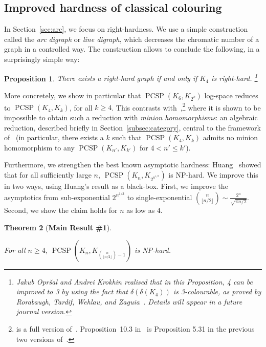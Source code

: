 \documentclass[11pt,a4paper]{scrartcl}
\newtheorem{theorem}{Theorem}
\numberwithin{theorem}{section}
\newtheorem{proposition}[theorem]{Proposition}
\theoremstyle{definition}
\DeclareMathOperator{\PCSP}{PCSP}
\newcommand\B[1]{{\textstyle\binom{#1}{\lfloor #1/2 \rfloor}}}
\begin{document}
\subsection{Improved hardness of classical colouring}

In Section~\ref{sec:arc}, we focus on right-hardness. We use a simple construction called the \emph{arc digraph} or \emph{line digraph}, which decreases the chromatic number of a graph in a controlled way.
The construction allows to conclude the following, in a surprisingly simple way:

\begin{proposition}\label{prop:right-hard}
	There exists a right-hard graph if and only if $K_4$ is right-hard.%
\footnote{Jakub Opr\v{s}al and Andrei Krokhin realised that in this Proposition, 4 can be improved to 3 by using the fact that $\delta(\delta(K_4))$ is 3-colourable, as proved by Rorabaugh, Tardif, Wehlau, and Zaguia~\cite{RTWZ16}. Details will appear in a future journal version.}	
\end{proposition}

More concretely, we show in particular that $\PCSP(K_6,K_{2^k})$ log-space
reduces to $\PCSP(K_4,K_k)$, for all $k \geq 4$. This contrasts
with~\cite[Proposition~10.3]{BartoBKO19},\footnote{\cite{BartoBKO19} is a full
version of~\cite{BulinKO18}. Proposition~10.3 in~\cite{BartoBKO19} is Proposition 5.31 in the
previous two versions of~\cite{BartoBKO19}.} where it is shown to be impossible to
obtain such a reduction with \emph{minion homomorphisms}: an algebraic
reduction, described briefly in Section~\ref{subsec:category}, central to the
framework of~\cite{BulinKO18,BartoBKO19} (in particular, there exists a $k$ such that
$\PCSP(K_4,K_k)$ admits no minion homomorphism to any $\PCSP(K_{n'},K_{k'})$ for
$4 < n' \leq k'$).

Furthermore, we strengthen the best known asymptotic hardness: Huang~\cite{Huang13} showed that for all sufficiently large $n$, $\PCSP(K_n, K_{2^{n^{1/3}}})$ is NP-hard.
We improve this in two ways, using Huang's result as a black-box.
First, we improve the asymptotics from sub-exponential $2^{n^{1/3}}$ to single-exponential  $\B{n} \sim \frac{2^n}{\sqrt{\pi n/2}}$.
Second, we show the claim holds for $n$ as low as $4$.

\newcommand{\ThmAsymp}{
	For all $n \geq 4$, $\PCSP(K_n, K_{\B{n}-1})$ is NP-hard.
}
\begin{theorem}[\textbf{Main Result \#1}]\label{thm:asymp}
  \ThmAsymp
\end{theorem}
\end{document}
